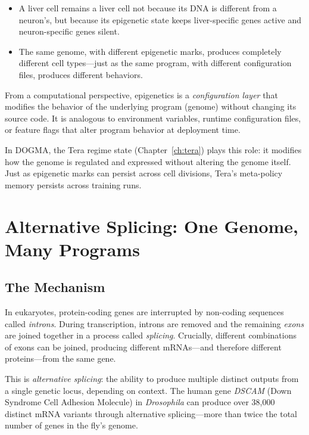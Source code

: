 \begin{itemize}[leftmargin=1.8em]
  \item A liver cell remains a liver cell not because its DNA is different from a neuron's, but because its epigenetic state keeps liver-specific genes active and neuron-specific genes silent.
  \item The same genome, with different epigenetic marks, produces completely different cell types---just as the same program, with different configuration files, produces different behaviors.
\end{itemize}

\begin{dogmadef}
From a computational perspective, epigenetics is a \emph{configuration layer} that modifies the behavior of the underlying program (genome) without changing its source code. It is analogous to environment variables, runtime configuration files, or feature flags that alter program behavior at deployment time.

In DOGMA, the Tera regime state (Chapter~\ref{ch:tera}) plays this role: it modifies how the genome is regulated and expressed without altering the genome itself. Just as epigenetic marks can persist across cell divisions, Tera's meta-policy memory persists across training runs.
\end{dogmadef}

\section{Alternative Splicing: One Genome, Many Programs}
\label{sec:alternative-splicing}

\subsection{The Mechanism}

In eukaryotes, protein-coding genes are interrupted by non-coding sequences called \emph{introns}. During transcription, introns are removed and the remaining \emph{exons} are joined together in a process called \emph{splicing}. Crucially, different combinations of exons can be joined, producing different mRNAs---and therefore different proteins---from the same gene.

This is \emph{alternative splicing}: the ability to produce multiple distinct outputs from a single genetic locus, depending on context. The human gene \textit{DSCAM} (Down Syndrome Cell Adhesion Molecule) in \textit{Drosophila} can produce over 38,000 distinct mRNA variants through alternative splicing---more than twice the total number of genes in the fly's genome.

